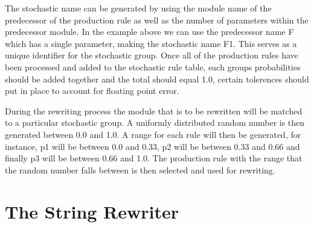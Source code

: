 \begin{flushleft}
\vspace{5mm}

The stochastic name can be generated by using the module name of the predecessor of the production rule as well as the number of parameters within the predecessor module. In the example above we can use the predecessor name F which has a single parameter, making the stochastic name F1. This serves as a unique identifier for the stochastic group. Once all of the production rules have been processed and added to the stochastic rule table, each groups probabilities should be added together and the total should equal 1.0, certain tolerences should put in place to account for floating point error. \\

\vspace{5mm}

During the rewriting process the module that is to be rewritten will be matched to a particular stochastic group. A uniformly distributed random number is then generated between 0.0 and 1.0. A range for each rule will then be generated, for instance, p1 will be between 0.0 and 0.33, p2 will be between 0.33 and 0.66 and finally p3 will be between 0.66 and 1.0. The production rule with the range that the random number falls between is then selected and used for rewriting. \\

\end{flushleft}

\section{The String Rewriter}

\begin{flushleft}



\end{flushleft}